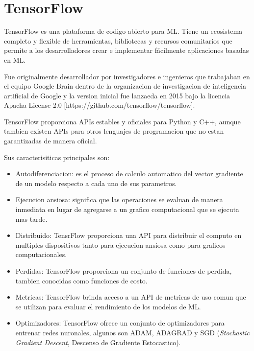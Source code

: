 \section{TensorFlow}
TensorFlow es una plataforma de codigo abierto para ML. Tiene un ecosistema completo y flexible de herramientas, bibliotecas y recursos comunitarios que permite a los desarrolladores crear e implementar fácilmente aplicaciones basadas en ML.

Fue originalmente desarrollador por investigadores e ingenieros que trabajaban en el equipo Google Brain dentro de la organizacion de investigacion de inteligencia artificial de Google y la version inicial fue lanzaeda en 2015 bajo la licencia Apacha License 2.0 [https://github.com/tensorflow/tensorflow].

TensorFlow proporciona APIs estables y oficiales para Python y C++, aunque tambien existen APIs para otros lenguajes de programacion que no estan garantizadas de manera oficial.

Sus caracterisiticas principales son:
\begin{itemize}
	\item Autodiferenciacion: es el proceso de calculo automatico del vector gradiente de un modelo respecto a cada uno de sus parametros.
	\item Ejecucion ansiosa: significa que las operaciones se evaluan de manera inmediata en lugar de agregarse a un grafico computacional que se ejecuta mas tarde.
	\item Distribuido: TensrFlow proporciona una API para distribuir el computo en multiples dispositivos tanto para ejecucion ansiosa como para graficos computacionales.
	\item Perdidas: TensorFlow proporciona un conjunto de funciones de perdida, tambien conocidas como funciones de costo.
	\item Metricas: TensorFlow brinda acceso a un API de metricas de uso comun que se utilizan para evaluar el rendimiento de los modelos de ML.
	\item Optimizadores: TensorFlow ofrece un conjunto de optimizadores para entrenar redes nuronales, algunos son ADAM, ADAGRAD y SGD (\textit{Stochastic Gradient Descent}, Descenso de Gradiente Estocastico).
\end{itemize} 

